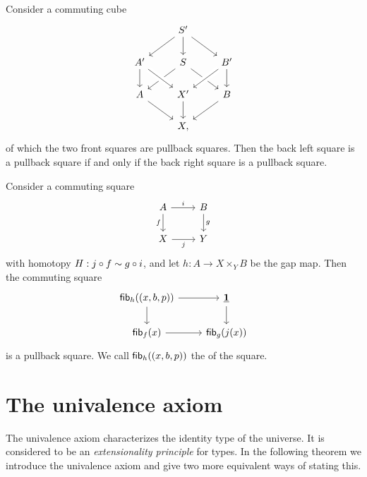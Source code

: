 \begin{cor}
Consider a commuting cube
\begin{equation*}
\begin{tikzcd}
& S' \arrow[dl] \arrow[dr] \arrow[d] \\
A' \arrow[d] & S \arrow[dl] \arrow[dr] & B' \arrow[dl,crossing over] \arrow[d] \\
A \arrow[dr] & X' \arrow[d] \arrow[from=ul,crossing over] & B \arrow[dl] \\
& X,
\end{tikzcd}
\end{equation*}
of which the two front squares are pullback squares. Then the back left square is a pullback square if and only if the back right square is a pullback square.
\end{cor}

\begin{prp}
Consider a commuting square
\begin{equation*}
\begin{tikzcd}
A \arrow[d,swap,"f"] \arrow[r,"i"] & B \arrow[d,"g"] \\
X \arrow[r,swap,"j"] & Y
\end{tikzcd}
\end{equation*}
with homotopy $H:j\circ f\sim g\circ i$, and let $h:A \to X\times_Y B$ be the gap map.
Then the commuting square
\begin{equation*}
\begin{tikzcd}
\fib{h}{(x,b,p)} \arrow[d] \arrow[r] & \unit \arrow[d] \\
\fib{f}{x} \arrow[r] & \fib{g}{j(x)}
\end{tikzcd}
\end{equation*}
is a pullback square. We call $\mathsf{fib}_{h}((x,b,p))$ the  of the square.
\end{prp}

\section{The univalence axiom}

The univalence axiom characterizes the identity type of the universe. It is considered to be an \emph{extensionality principle} for types. In the following theorem we introduce the univalence axiom and give two more equivalent ways of stating this.


